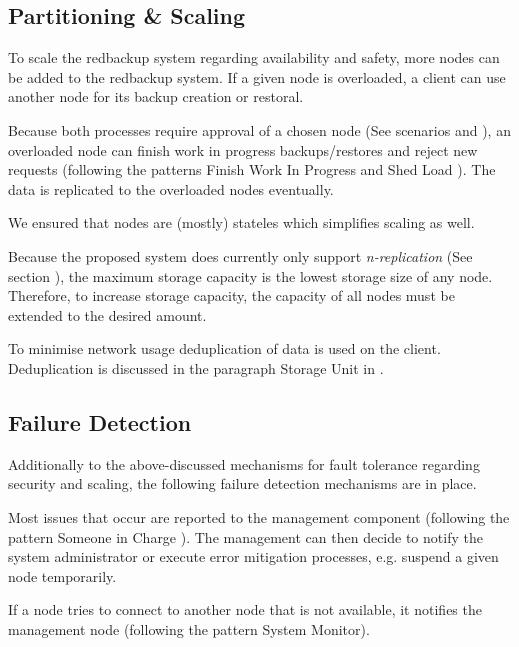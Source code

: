 \subsection{Partitioning \& Scaling}

To scale the redbackup system regarding availability and safety, more \glspl{node} can be added to the redbackup system. If a given \gls{node} is overloaded, a \gls{client} can use another \gls{node} for its backup creation or restoral.

Because both processes require approval of a chosen \gls{node} (See scenarios  and ), an overloaded \gls{node} can finish work in progress backups/restores and reject new requests (following the patterns Finish Work In Progress and Shed Load \cite{fault-tolerance}). The data is replicated to the overloaded \glspl{node} eventually.

We ensured that \glspl{node} are (mostly) stateles which simplifies scaling as well.

Because the proposed system does currently only support \emph{n-replication} (See section ), the maximum storage capacity is the lowest storage size of any node. Therefore, to increase storage capacity, the capacity of all \glspl{node} must be extended to the desired amount.

To minimise network usage deduplication of data is used on the \gls{client}. Deduplication is  discussed in the paragraph Storage Unit in  .

\subsection{Failure Detection}

Additionally to the above-discussed mechanisms for fault tolerance regarding security and scaling, the following failure detection mechanisms are in place.

Most issues that occur are reported to the \gls{management} component (following the pattern Someone in Charge \cite{fault-tolerance}). The \gls{management} can then decide to notify the system administrator or execute error mitigation processes, e.g. suspend a given \gls{node} temporarily.

If a node tries to connect to another node that is not available, it notifies the management node (following the pattern System Monitor\cite{fault-tolerance}).

